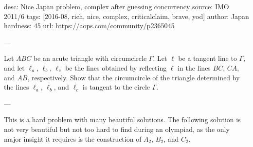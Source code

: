 desc: Nice Japan problem, complex after guessing concurrency
source: IMO 2011/6
tags: [2016-08, rich, nice, complex, criticalclaim, brave, yod]
author: Japan
hardness: 45
url: https://aops.com/community/p2365045

---

Let $ABC$ be an acute triangle with circumcircle $\Gamma$.
Let $\ell$ be a tangent line to $\Gamma$, and let $\ell_a$, $\ell_b$, $\ell_c$ be the lines obtained
by reflecting $\ell$ in the lines $BC$, $CA$, and $AB$, respectively.
Show that the circumcircle of the triangle determined by the lines $\ell_a$, $\ell_b$, and $\ell_c$
is tangent to the circle $\Gamma$.

---

This is a hard problem with many beautiful solutions.
The following solution is not very beautiful but not too hard to find during an olympiad,
as the only major insight it requires is the construction of $A_2$, $B_2$, and $C_2$.

